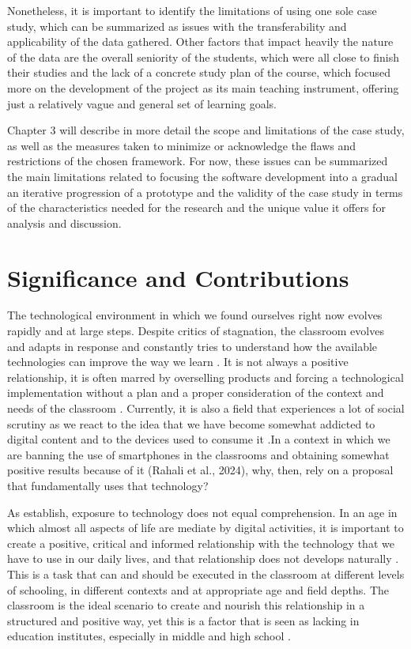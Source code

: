 Nonetheless, it is important to identify the limitations of using one sole case study, which can be summarized as issues with the transferability and applicability of the data gathered.
Other factors that impact heavily the nature of the data are the overall seniority of the students, which were all close to finish their studies and the lack of a concrete study plan of
the course, which focused more on the development of the project as its main teaching instrument, offering just a relatively vague and general set of learning goals.

Chapter 3 will describe in more detail the scope and limitations of the case study, as well as the measures taken to minimize or acknowledge the flaws and restrictions of the chosen
framework. For now, these issues can be summarized the main limitations related to focusing the software development into a gradual an iterative progression of a prototype and the validity
of the case study in terms of the characteristics needed for the research and the unique value it offers for analysis and discussion.

\section{Significance and Contributions \label{sec:1-3}}

The technological environment in which we found ourselves right now evolves rapidly and at large steps. Despite critics of stagnation, the classroom evolves and adapts in response and
constantly tries to understand how the available technologies can improve the way we learn \parencite{watters_2021}. It is not always a positive relationship, it is often marred by
overselling products and forcing a technological implementation without a plan and a proper consideration of the context and needs of the classroom \parencite{odunaike_2013,cochrane_2012}.
Currently, it is also a field that experiences a lot of social scrutiny as we react to the idea that we have become somewhat addicted to digital content and to the devices used to consume
it \parencite{liu_2022,gui_2021}.In a context in which we are banning the use of smartphones in the classrooms and obtaining somewhat positive results because of it (Rahali et al., 2024),
why, then, rely on a proposal that fundamentally uses that technology?

As \textcite{murray_2014} establish, exposure to technology does not equal comprehension. In an age in which almost all aspects of life are mediate by digital activities, it is important to
create a positive, critical and informed relationship with the technology that we have to use in our daily lives, and that relationship does not develops naturally \parencite{selwyn_2009,margaryan_2011}.
This is a task that can and should be executed in the classroom at different levels of schooling, in different contexts and at appropriate age and field depths. The classroom is the ideal
scenario to create and nourish this relationship in a structured and positive way, yet this is a factor that is seen as lacking in education institutes, especially in middle and high school \parencite{burton_2015,jeffrey_2011}.

